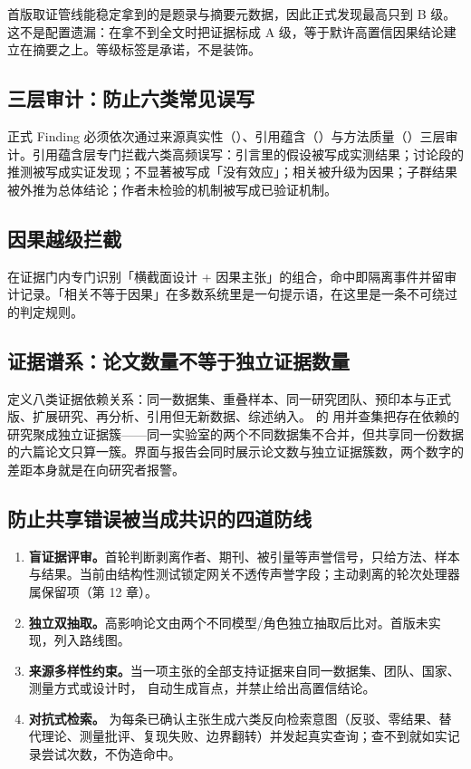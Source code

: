 \begin{honestbox}
首版取证管线能稳定拿到的是题录与摘要元数据，因此正式发现最高只到 B 级。这不是配置遗漏：在拿不到全文时把证据标成 A 级，等于默许高置信因果结论建立在摘要之上。等级标签是承诺，不是装饰。
\end{honestbox}

\subsection{三层审计：防止六类常见误写}

正式 Finding 必须依次通过来源真实性（）、引用蕴含（）与方法质量（）三层审计。引用蕴含层专门拦截六类高频误写：引言里的假设被写成实测结果；讨论段的推测被写成实证发现；不显著被写成「没有效应」；相关被升级为因果；子群结果被外推为总体结论；作者未检验的机制被写成已验证机制。

\subsection{因果越级拦截}

 在证据门内专门识别「横截面设计 + 因果主张」的组合，命中即隔离事件并留审计记录。「相关不等于因果」在多数系统里是一句提示语，在这里是一条不可绕过的判定规则。

\subsection{证据谱系：论文数量不等于独立证据数量}

 定义八类证据依赖关系：同一数据集、重叠样本、同一研究团队、预印本与正式版、扩展研究、再分析、引用但无新数据、综述纳入。 的  用并查集把存在依赖的研究聚成独立证据簇——同一实验室的两个不同数据集不合并，但共享同一份数据的六篇论文只算一簇。界面与报告会同时展示论文数与独立证据簇数，两个数字的差距本身就是在向研究者报警。

\subsection{防止共享错误被当成共识的四道防线}

\begin{enumerate}[leftmargin=1.6em, itemsep=3pt]
\item \textbf{盲证据评审。}首轮判断剥离作者、期刊、被引量等声誉信号，只给方法、样本与结果。当前由结构性测试锁定网关不透传声誉字段；主动剥离的轮次处理器属保留项（第 12 章）。
\item \textbf{独立双抽取。}高影响论文由两个不同模型/角色独立抽取后比对。首版未实现，列入路线图。
\item \textbf{来源多样性约束。}当一项主张的全部支持证据来自同一数据集、团队、国家、测量方式或设计时， 自动生成盲点，并禁止给出高置信结论。
\item \textbf{对抗式检索。} 为每条已确认主张生成六类反向检索意图（反驳、零结果、替代理论、测量批评、复现失败、边界翻转）并发起真实查询；查不到就如实记录尝试次数，不伪造命中。
\end{enumerate}
